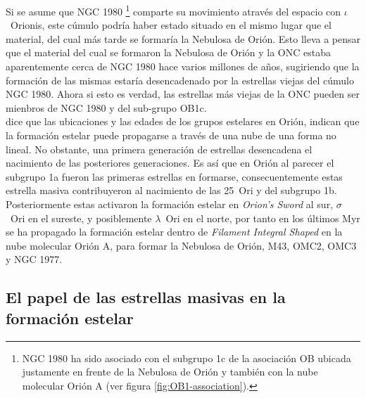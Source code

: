 Si se asume que NGC 1980 \footnote{NGC 1980 ha sido asociado con el subgrupo 1c de la asociación OB ubicada justamente en frente de la Nebulosa de Orión y también con la nube molecular Orión A (ver figura \ref{fig:OB1-association}).} comparte su movimiento através del espacio con \(\iota\)~Orionis, este cúmulo podría haber estado situado en el mismo lugar que el material, del cual más tarde se formaría la Nebulosa de Orión. Esto lleva a pensar que el material del cual se formaron la Nebulosa de Orión y la ONC estaba aparentemente cerca de NGC 1980 hace varios millones de años, sugiriendo que la formación de las mismas estaría desencadenado por la estrellas viejas del cúmulo NGC 1980. Ahora si esto es verdad, las estrellas más viejas de la ONC pueden ser mienbros de NGC 1980 y del sub-grupo OB1c.\\

\citet{Bally:2008a} dice que las ubicaciones y las edades de los grupos estelares en Orión, indican que la formación estelar puede propagarse a través de una nube de una forma no lineal. No obstante, una primera generación de estrellas desencadena el nacimiento de las posteriores generaciones. Es así que en Orión al parecer el subgrupo 1a fueron las primeras estrellas en formarse, consecuentemente estas estrella masiva contribuyeron al nacimiento de las 25~Ori y del subgrupo 1b. Posteriormente estas activaron la formación estelar en \textit{Orion's Sword} al sur, \(\sigma\)~Ori en el sureste, y posiblemente \(\lambda\)~Ori en el norte, por tanto en los últimos Myr se ha propagado la formación estelar dentro de \textit{Filament Integral Shaped} en la nube molecular Orión A, para formar la Nebulosa de Orión, M43, OMC2, OMC3 y NGC 1977.\\ 

\subsection{El papel de las estrellas masivas en la formación estelar}
\label{sec:star-masivas}

